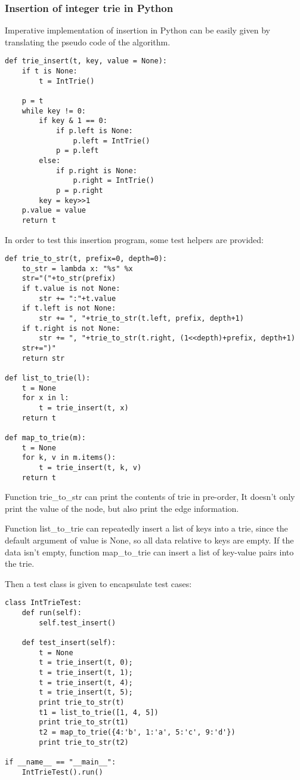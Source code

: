 \documentclass{article}
\begin{document}
\subsubsection*{Insertion of integer trie in Python}
Imperative implementation of insertion in Python can be easily given by translating
the pseudo code of the algorithm.

\lstset{language=Python}
\begin{lstlisting}
def trie_insert(t, key, value = None):
    if t is None:
        t = IntTrie()

    p = t
    while key != 0:
        if key & 1 == 0:
            if p.left is None:
                p.left = IntTrie()
            p = p.left
        else:
            if p.right is None:
                p.right = IntTrie()
            p = p.right
        key = key>>1
    p.value = value
    return t
\end{lstlisting}

In order to test this insertion program, some test helpers are provided:

\begin{lstlisting}
def trie_to_str(t, prefix=0, depth=0):
    to_str = lambda x: "%s" %x
    str="("+to_str(prefix)
    if t.value is not None:
        str += ":"+t.value
    if t.left is not None:
        str += ", "+trie_to_str(t.left, prefix, depth+1)
    if t.right is not None:
        str += ", "+trie_to_str(t.right, (1<<depth)+prefix, depth+1)
    str+=")"
    return str

def list_to_trie(l):
    t = None
    for x in l:
        t = trie_insert(t, x)
    return t

def map_to_trie(m):
    t = None
    for k, v in m.items():
        t = trie_insert(t, k, v)
    return t
\end{lstlisting}

Function trie\_to\_str can print the contents of trie in pre-order,
It doesn't only print the value of the node, but also print the edge information.

Function list\_to\_trie can repeatedly insert a list of keys into a trie, since the
default argument of value is None, so all data relative to keys are empty. If the
data isn't empty, function map\_to\_trie can insert a list of key-value pairs into 
the trie.

Then a test class is given to encapsulate test cases:

\begin{lstlisting}
class IntTrieTest:
    def run(self):
        self.test_insert()

    def test_insert(self):
        t = None
        t = trie_insert(t, 0);
        t = trie_insert(t, 1);
        t = trie_insert(t, 4);
        t = trie_insert(t, 5);
        print trie_to_str(t)
        t1 = list_to_trie([1, 4, 5])
        print trie_to_str(t1)
        t2 = map_to_trie({4:'b', 1:'a', 5:'c', 9:'d'})
        print trie_to_str(t2)

if __name__ == "__main__":
    IntTrieTest().run()
\end{lstlisting}
\end{document}
